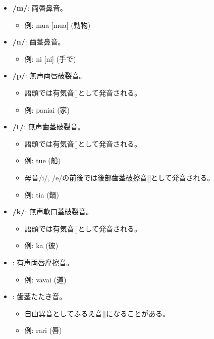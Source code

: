 \begin{itemize}
    \item \textbf{/m/}: 両唇鼻音。
    \begin{itemize}
        \item 例: mua [mua] (動物)
    \end{itemize}

    \item \textbf{/n/}: 歯茎鼻音。
    \begin{itemize}
        \item 例: ni [ni] (手で)
    \end{itemize}

    \item \textbf{/p/}: 無声両唇破裂音。
    \begin{itemize}
        \item 語頭では有気音[]として発音される。
        \item 例:  paniai  (家)
    \end{itemize}

    \item \textbf{/t/}: 無声歯茎破裂音。
    \begin{itemize}
        \item 語頭では有気音[]として発音される。
        \item 例: tue \textipa{[t\super{h}ue]} (船)
        \item 母音/i/, /e/の前後では後部歯茎破擦音[]として発音される。
        \item 例: tia \textipa{[tS\super{h}ia]} (鍋)
    \end{itemize}

    \item \textbf{/k/}: 無声軟口蓋破裂音。
    \begin{itemize}
        \item 語頭では有気音[]として発音される。
        \item 例: ka \textipa{[k\super{h}a]} (彼)
    \end{itemize}

    
\item \textbf{}: 有声両唇摩擦音。
    \begin{itemize}
        \item 例: vavai \textipa{[BaBai]} (道)
    \end{itemize}
    
    \item \textbf{}: 歯茎たたき音。
    \begin{itemize}
        \item 自由異音としてふるえ音[]になることがある。
        \item 例: rari \textipa{[RaRi]} (唇)
    \end{itemize}
\end{itemize}